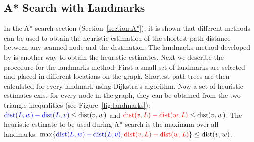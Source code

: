 \subsection{A* Search with Landmarks}
In the A* search section (Section~\ref{section:A*}), 
it is shown that different methods can be used to obtain the heuristic estimation of the shortest path distance between any scanned node and the destination.
The landmarks method developed by \citet{GoldbergLandmarks} is another way to obtain the heuristic estimates.
Next we describe the procedure for the landmarks method.
First a small set of landmarks are selected and placed in different locations on the graph.
Shortest path trees are then calculated for every landmark using Dijkstra's algorithm.
Now a set of heuristic estimates exist for every node in the graph,
they can be obtained from the two triangle inequalities (see Figure~\ref{fig:landmarks}):
$ \textcolor{blue}{\text{dist}(L,w)-\text{dist}(L,v)} \leq \text{dist}(v, w)$ 
and
$ \textcolor{red}{\text{dist}(v,L)-\text{dist}(w,L)} \leq \text{dist}(v, w)$.
The heuristic estimate to be used during A* search is the maximum over all landmarks:
$ \max\{ \textcolor{blue}{\text{dist}(L,w)-\text{dist}(L,v)}, \textcolor{red}{\text{dist}(v,L)-\text{dist}(w,L)} \} \leq \text{dist}(v,w)$.

